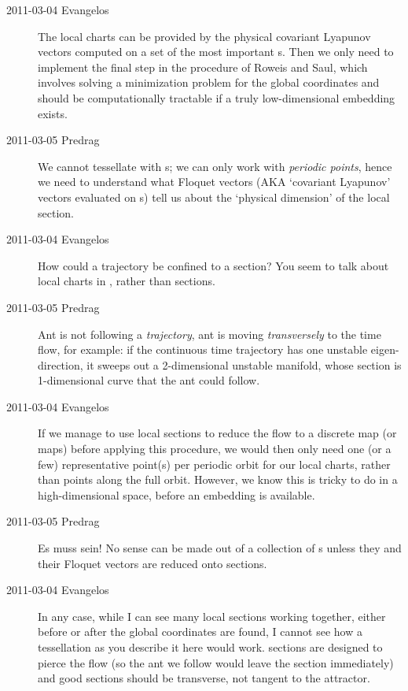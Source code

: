 \begin{description}
\item[2011-03-04 Evangelos]
The local charts can be provided by the physical covariant Lyapunov
vectors computed on a set of the most important \po s. Then we only need
to implement the final step in the procedure of Roweis and
Saul, which involves solving a minimization problem for the
global coordinates and should be computationally tractable if a truly
low-dimensional embedding exists.

\item[2011-03-05 Predrag]
We cannot tessellate with \po s; we can only work with \emph{periodic
points}, hence we need to understand what Floquet vectors (AKA `covariant
Lyapunov' vectors evaluated on \po s) tell us about the `physical
dimension' of the local \Poincare section.

\item[2011-03-04 Evangelos]
How could a trajectory be confined to a \Poincare section? You seem
to talk about local charts in , rather than \Poincare sections.

\item[2011-03-05 Predrag]
Ant is not following a \emph{trajectory}, ant is moving \emph{transversely}
to the time flow, for example: if the continuous time trajectory has one
unstable eigen-direction, it sweeps out a 2-dimensional unstable manifold,
whose \Poincare section is 1-dimensional curve that the ant could follow.

\item[2011-03-04 Evangelos]
If we manage to use local \Poincare sections to reduce the flow to a
discrete map (or maps) before applying this procedure, we would then only
need one (or a few) representative point(s) per periodic orbit for our
local charts, rather than points along the full orbit. However, we know
this is tricky to do in a high-dimensional space, before an embedding is
available.

\item[2011-03-05 Predrag]
{Es muss sein!} No sense can be made out of a collection of \po s unless
they and their Floquet vectors are reduced onto  \Poincare sections.

\item[2011-03-04 Evangelos]
In any case, while I can see many local \Poincare sections working
together, either before or after the global coordinates are found, I
cannot see how a tessellation as you describe it here would work.
\Poincare sections are designed to pierce the flow (so the ant we follow
would leave the section immediately) and good sections should be
transverse, not tangent to the attractor.


\end{description}
